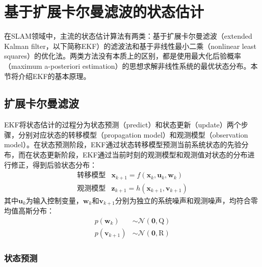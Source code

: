 \section{基于扩展卡尔曼滤波的状态估计}

在SLAM领域中，主流的状态估计算法有两类：基于扩展卡尔曼滤波（extended Kalman filter，以下简称EKF）的滤波法和基于非线性最小二乘（nonlinear least squares）的优化法。两类方法没有本质上的区别，都是使用最大化后验概率（maximum a-posteriori estimation）的思想求解非线性系统的最优状态分布。本节将介绍EKF的基本原理。

\subsection{扩展卡尔曼滤波}

EKF将状态估计的过程分为状态预测（predict）和状态更新（update）两个步骤，分别对应状态的转移模型（propagation model）和观测模型（observation model）。在状态预测阶段，EKF通过状态转移模型预测当前系统状态的先验分布，而在状态更新阶段，EKF通过当前时刻的观测模型和观测值对状态的分布进行修正，得到后验状态分布：
\begin{equation}
\begin{array}{rl}
    \text{转移模型} & \bm{x}_{k+1} = f(\bm{x}_k,\bm{u}_k,\bm{w}_k) \\
    \text{观测模型} & \bm{z}_{k+1} = h(\bm{x}_{k+1},\bm{v}_{k+1})
\end{array}
\end{equation}
其中$\bm{u}_k$为输入控制变量，$\bm{w}_k$和$\bm{v}_{k+1}$分别为独立的系统噪声和观测噪声，均符合零均值高斯分布：
\begin{equation}
\begin{aligned}
    p(\bm{w}_k)     &\sim \mathcal{N}(\bm{0},\mathrm{Q}) \\
    p(\bm{v}_{k+1}) &\sim \mathcal{N}(\bm{0},\mathrm{R})
\end{aligned}
\end{equation}

\subsubsection{状态预测}

